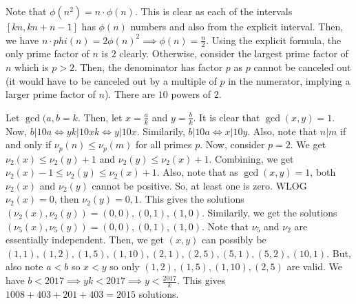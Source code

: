 \documentclass[11pt]{article}
\begin{document}

\begin{sol}
Note that $\phi(n^2)=n\cdot \phi(n)$. This is clear as each of the intervals $[kn,kn+n-1]$ has $\phi(n)$ numbers and also from the explicit interval. Then, we have $n\cdot phi(n)=2\phi(n)^2\implies \phi(n)=\frac{n}{2}$. Using the explicit formula, the only prime factor of $n$ is $2$ clearly. Otherwise, consider the largest prime factor of $n$ which is $p>2$. Then, the denominator has factor $p$ as $p$ cannot be canceled out (it would have to be canceled out by a multiple of $p$ in the numerator, implying a larger prime factor of $n$). There are $\boxed{10}$ powers of $2$.
\end{sol}


\begin{sol}
Let $\gcd(a,b=k$. Then, let $x=\frac{a}{k}$ and $y=\frac{b}{k}$. It is clear that $\gcd(x,y)=1$. Now, $b|10a\iff yk|10xk\iff y|10x$. Similarily, $b|10a\iff x|10y$. Also, note that $n|m$ if and only if $\nu_{p}(n)\leq \nu_{p}(m)$ for all primes $p$. Now, consider $p=2$. We get $\nu_{2}(x)\leq \nu_{2}(y)+1$ and $\nu_{2}(y)\leq \nu_{2}(x)+1$. Combining, we get $\nu_{2}(x)-1\leq \nu_{2}(y)\leq \nu_{2}(x)+1$. Also, note that as $\gcd(x,y)=1$, both $\nu_{2}(x)$ and $\nu_{2}(y)$ cannot be positive. So, at least one is zero. WLOG $\nu_{2}(x)=0$, then $\nu_{2}(y)=0,1$. This gives the solutions $(\nu_{2}(x),\nu_{2}(y))=(0,0),(0,1),(1,0)$. Similarily, we get the solutions $(\nu_{5}(x),\nu_{5}(y))=(0,0),(0,1),(1,0)$. Note that $\nu_{5}$ and $\nu_{2}$ are essentially independent. Then, we get $(x,y)$ can possibly be $(1,1),(1,2),(1,5),(1,10),(2,1),(2,5),(5,1),(5,2),(10,1)$. But, also note $a<b$ so $x<y$ so only $(1,2),(1,5),(1,10),(2,5)$ are valid. We have $b<2017\implies yk<2017\implies y < \frac{2017}{k}$. This gives $1008+403+201+403=\boxed{2015}$ solutions.
\end{sol}

\end{document}
